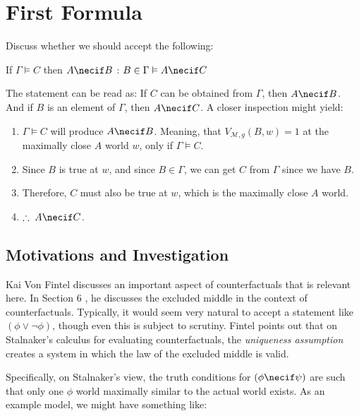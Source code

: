 \documentclass{article}
\begin{document}
    \section{First Formula}
    \begin{task}
        Discuss whether we should accept the following: 
        \begin{center}
            If $\Gamma \vDash C$ then $A \necif B$ : $B \in \Gamma \vDash A \necif C$   
        \end{center}
    \end{task}

    The statement can be read as:
    If $C$ can be obtained from $\Gamma$, then $A \necif B$. 
    And if $B$ is an element of $\Gamma$, then $A \necif C$.
    A closer inspection might yield: 

    \begin{enumerate}
        \item $\Gamma \vDash C$ will produce $A \necif B$. Meaning, that $V_{\mathscr{M},g}(B, w) = 1$ at the maximally close $A$ world $w$, only if $\Gamma \vDash C$.
        \item Since $B$ is true at $w$, and since $B \in \Gamma$, we can get $C$ from $\Gamma$ since we have $B$.
        \item Therefore, $C$ must also be true at $w$, which is the maximally close $A$ world.
        \item $\therefore \; A \necif C$.
    \end{enumerate}

    

    \subsection{Motivations and Investigation}  

        Kai Von Fintel discusses an important aspect of counterfactuals that is relevant here. 
        In Section 6 \cite{fintel}, he discusses the excluded middle in the context of counterfactuals. 
        Typically, it would seem very natural to accept a statement like $(\phi \vee \lnot \phi)$, though even this is subject to scrutiny.
        Fintel points out that on Stalnaker's calculus for evaluating counterfactuals, the \textit{uniqueness assumption} creates a system in which the law of the excluded middle is valid.

        Specifically, on Stalnaker's view, the truth conditions for $(\phi \necif \psi)$ are such that only one $\phi$ world maximally similar to the actual world exists. 
        As an example model, we might have something like: 
\end{document}
